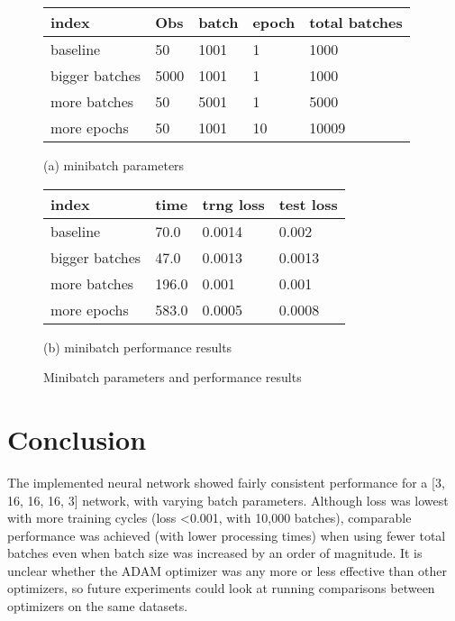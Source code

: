 \documentclass{article}
\begin{document}
\begin{figure}[htb]
\begin{minipage}[b]{1.0\linewidth}
\begin{tabular}
{|l|l|l|l|l|}
\hline
 index & Obs & batch & epoch & total batches \\
\hline
 baseline & 50 & 1001 & 1 & 1000 \\
 bigger batches & 5000 & 1001 & 1 & 1000 \\
 more batches & 50 & 5001 & 1 & 5000 \\
 more epochs & 50 & 1001 & 10 & 10009 \\
\hline
\end{tabular}
  \centering
  \centerline{(a) minibatch parameters}\medskip
  
\begin{tabular}
{|l|l|l|l|}
\hline
 index & time & trng loss & test loss\\
\hline
 baseline & 70.0 & 0.0014 & 0.002\\
 bigger batches &  47.0 & 0.0013 & 0.0013 \\
 more batches & 196.0 & 0.001 & 0.001\\
 more epochs & 583.0 & 0.0005 & 0.0008\\
\hline
\end{tabular}

  \centering
  \centerline{(b) minibatch performance results}\medskip
\end{minipage}
\caption{Minibatch parameters and performance results}
\label{fig:res}
%
\end{figure}

\section{Conclusion}
\label{sec:conclusion}
The implemented neural network showed fairly consistent performance for a [3, 16, 16, 16, 3] network, with varying batch parameters.  Although loss was lowest with more training cycles (loss <0.001, with 10,000 batches), comparable performance was achieved (with lower processing times) when using fewer total batches even when batch size was increased by an order of magnitude.  It is unclear whether the ADAM optimizer was any more or less effective than other optimizers, so future experiments could look at running comparisons between optimizers on the same datasets. 
\end{document}
